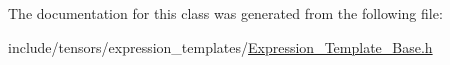 The documentation for this class was generated from the following file\+:\begin{DoxyCompactItemize}
\item 
include/tensors/expression\+\_\+templates/\hyperlink{Expression__Template__Base_8h}{Expression\+\_\+\+Template\+\_\+\+Base.\+h}\end{DoxyCompactItemize}
